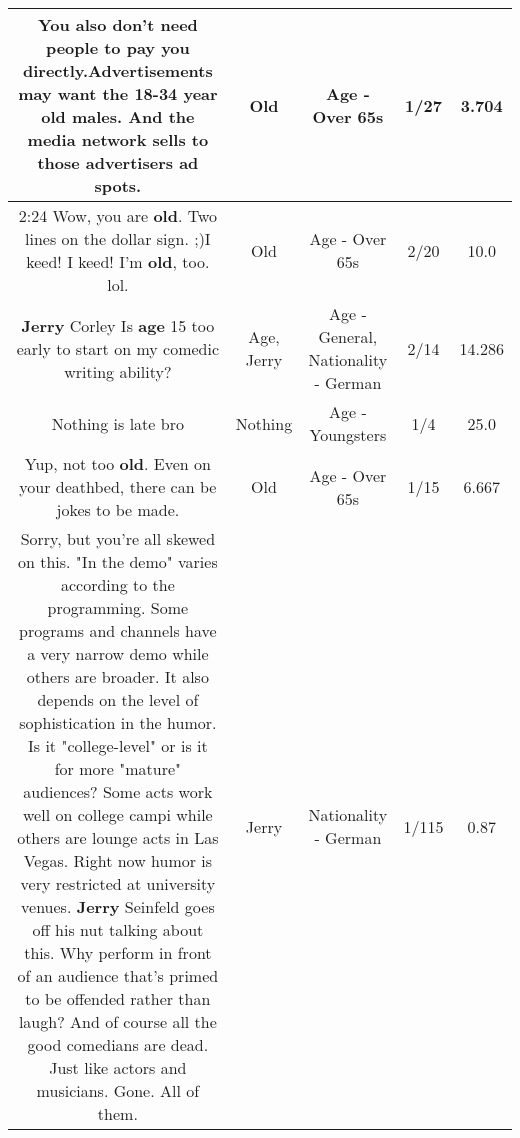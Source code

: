 \documentclass[11pt]{article}
\newlength\mylength
\begin{document}
\begin{center}
\begin{longtable}{|C{.65\mylength}|C{.30\mylength}|C{.12\mylength}|C{.12\mylength}|C{.12\mylength}|}
  \small You also don't need people to pay you directly.Advertisements may want the 18-34 year \textbf{old} males. And the media network sells to those advertisers ad spots.\normalsize   & Old & Age - Over 65s & 1/27 & 3.704 \\  \hline
  \small 2:24 Wow, you are \textbf{old}. Two lines on the dollar sign. ;)I keed! I keed! I'm \textbf{old}, too. lol.\normalsize   & Old & Age - Over 65s & 2/20 & 10.0 \\  \hline
  \small \@\textbf{Jerry} Corley Is \textbf{age} 15 too early to start on my comedic writing ability?\normalsize   & Age, Jerry & Age - General, Nationality - German & 2/14 & 14.286 \\  \hline
  \small Nothing is late bro\normalsize   & Nothing & Age - Youngsters & 1/4 & 25.0 \\  \hline
  \small Yup, not too \textbf{old}. Even on your deathbed, there can be jokes to be made.\normalsize   & Old & Age - Over 65s & 1/15 & 6.667 \\  \hline
  \small Sorry, but you're all skewed on this. "In the demo" varies according to the programming. Some programs and channels have a very narrow demo while others are broader. It also depends on the level of sophistication in the humor. Is it "college-level" or is it for more "mature" audiences? Some acts work well on college campi while others are lounge acts in Las Vegas. Right now humor is very restricted at university venues. \textbf{Jerry} Seinfeld goes off his nut talking about this. Why perform in front of an audience that's primed to be offended rather than laugh? And of course all the good comedians are dead. Just like actors and musicians. Gone. All of them.\normalsize   & Jerry & Nationality - German & 1/115 & 0.87 \\  \hline

\end{longtable}
\end{center}
\end{document}
